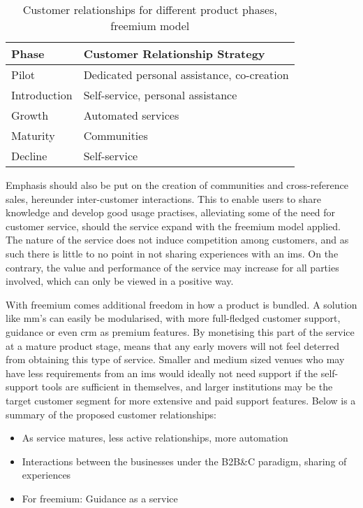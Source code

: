 \begin{table}[]
\centering
\caption{Customer relationships for different product phases, freemium model}
\label{relationshipstrat}
\begin{tabular}{|l|l|}
\hline
\textbf{Phase} & \textbf{Customer Relationship Strategy}    \\ \hline
Pilot          & Dedicated personal assistance, co-creation \\ \hline
Introduction   & Self-service, personal assistance          \\ \hline
Growth         & Automated services                         \\ \hline
Maturity       & Communities                                \\ \hline
Decline        & Self-service                               \\ \hline
\end{tabular}
\end{table}


Emphasis should also be put on the creation of communities and cross-reference sales, hereunder inter-customer interactions. This to enable users to share knowledge and develop good usage practises, alleviating some of the need for customer service, should the service expand with the freemium model applied. The nature of the service does not induce competition among customers, and as such there is little to no point in not sharing experiences with an \gls{ims}. On the contrary, the value and performance of the service may increase for all parties involved, which can only be viewed in a positive way. 


With freemium comes additional freedom in how a product is bundled. A solution like \gls{mm}'s can easily be modularised, with more full-fledged customer support, guidance or even \gls{crm} as premium features. By monetising this part of the service at a mature product stage, means that any early movers will not feel deterred from obtaining this type of service. Smaller and medium sized venues who may have less requirements from an \gls{ims} would ideally not need support if the self-support tools are sufficient in themselves, and larger institutions may be the target customer segment for more extensive and paid support features. Below is a summary of the proposed customer relationships:

\begin{itemize}
    \item As service matures, less active relationships, more automation
    \item Interactions between the businesses under the B2B\&C paradigm, sharing of experiences
    \item For freemium: Guidance as a service
\end{itemize}

